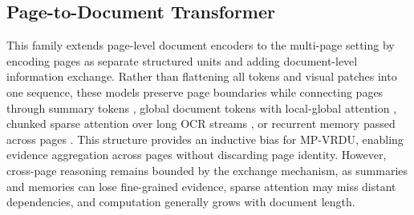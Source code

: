 \documentclass[11pt]{article}
\begin{document}
\subsection{Page-to-Document Transformer}
This family extends page-level document encoders to the multi-page setting by encoding pages as separate structured units and adding document-level information exchange. Rather than flattening all tokens and visual patches into one sequence, these models preserve page boundaries while connecting pages through summary tokens \cite{tito2023hierarchical}, global document tokens with local-global attention \cite{blau2024gram}, chunked sparse attention over long OCR streams \cite{borchmann2025arctic}, or recurrent memory passed across pages \cite{dong2024multi}. This structure provides an inductive bias for MP-VRDU, enabling evidence aggregation across pages without discarding page identity. However, cross-page reasoning remains bounded by the exchange mechanism, as summaries and memories can lose fine-grained evidence, sparse attention may miss distant dependencies, and computation generally grows with document length.

\end{document}
